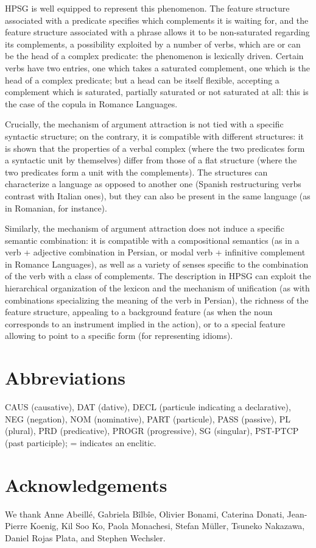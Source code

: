 \documentclass[output=paper
	        ,collection
	        ,collectionchapter
 	        ,biblatex
                ,babelshorthands
                ,newtxmath
                ,draftmode
                ,colorlinks, citecolor=brown
]{langscibook}
\begin{document}
{HPSG is well equipped to represent this phenomenon. The feature structure associated with a predicate specifies which complements it is waiting for, and the feature structure associated with a phrase allows it to be non-saturated regarding its complements, a possibility exploited by a number of verbs, which are or can be the head of a complex predicate: the phenomenon is lexically driven. Certain verbs have two entries, one which takes a saturated complement, one which is the head of a complex predicate; but a head can be itself flexible, accepting a complement which is saturated, partially saturated or not saturated at all: this is the case of the copula in Romance Languages.

Crucially, the mechanism of argument attraction is not tied with a specific syntactic structure; on the contrary, it is compatible with different structures: it is shown that the properties of a verbal complex (where the two predicates form a syntactic unit by themselves) differ from those of a flat structure (where the two predicates form a unit with the complements). The structures can characterize a language as opposed to another one (Spanish restructuring verbs contrast with Italian ones), but they can also be present in the same language (as in Romanian, for instance). 

Similarly, the mechanism of argument attraction does not induce a specific semantic combination: it is compatible with a compositional semantics (as in a verb + adjective combination in Persian, or modal verb + infinitive complement in Romance Languages), as well as a variety of senses specific to the combination of the verb with a class of complements. The description in HPSG can exploit the hierarchical organization of the lexicon and the mechanism of unification (as with combinations specializing the meaning of the verb in Persian), the richness of the feature structure, appealing to a background feature (as when the noun corresponds to an instrument implied in the action), or to a special feature allowing to point to a specific form (for representing idioms).    

} %

\section*{Abbreviations}

CAUS (causative), DAT (dative), DECL (particule indicating a declarative), NEG (negation), NOM (nominative), PART (particule), PASS (passive), PL (plural), PRD (predicative), PROGR (progressive), SG (singular), PST-PTCP (past participle); = indicates an enclitic.

\section*{Acknowledgements}

We thank Anne Abeill\'e, Gabriela B\^ilb\^ie, Olivier Bonami, Caterina Donati, Jean-Pierre Koenig, Kil Soo Ko, Paola Monachesi, Stefan Müller, Tsuneko Nakazawa, Daniel Rojas Plata, and Stephen Wechsler. 

{\sloppy
	\printbibliography[heading=subbibliography,notkeyword=this]
}
\end{document}

